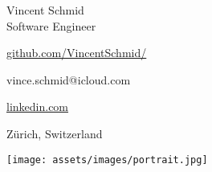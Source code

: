 \vspace{0pt}
\begin{minipage}[t]{0.6\textwidth}
    \vspace{0pt}
    {\sectionfont\fontsize{20}{30}\selectfont\color{black}
        Vincent Schmid\\[0.2em]
    }
    {\sectionfont\fontsize{13}{14}\selectfont\color{altColor}
        Software Engineer\\[0.6em]
    }
    \begin{minipage}[t]{0.58\linewidth}
        \begin{description}[labelwidth=1em]
            \item[\faGithub\color{altColor}] \href{https://github.com/VincentSchmid/}{github.com/VincentSchmid/}
            \item[\faEnvelopeO\color{altColor}] vince.schmid@icloud.com
        \end{description}
        \vspace{.5em}
    \end{minipage}
    \hfill
    \begin{minipage}[t]{0.38\linewidth}
        \begin{description}[labelwidth=1em]
            \item[\faLinkedin\color{altColor}] \href{https://www.linkedin.com/in/vincent-schmid-b931787a/}{linkedin.com}
            \item[\faMapMarker\color{altColor}] Zürich, Switzerland
        \end{description}
    \end{minipage}
\end{minipage}
\hfill
\begin{minipage}[t]{0.38\textwidth}
    \vspace{0pt}
    \hfill\texttt{[image: assets/images/portrait.jpg]}
    \vspace{1em}
\end{minipage}
